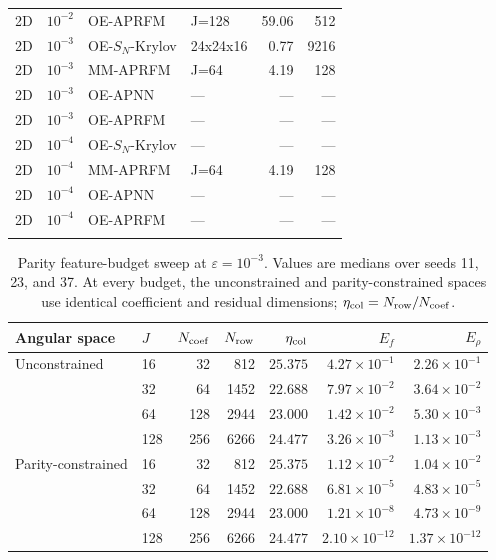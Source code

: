 \begin{table}[t]
\begin{tabular}{lcllrr}
2D & $10^{-2}$ & OE-APRFM & J=128 & 59.06 & 512\\
\addlinespace
2D & $10^{-3}$ & OE-$S_N$-Krylov & 24x24x16 & 0.77 & 9216\\
2D & $10^{-3}$ & MM-APRFM & J=64 & 4.19 & 128\\
2D & $10^{-3}$ & OE-APNN & --- & --- & ---\\
2D & $10^{-3}$ & OE-APRFM & --- & --- & ---\\
\addlinespace
2D & $10^{-4}$ & OE-$S_N$-Krylov & --- & --- & ---\\
2D & $10^{-4}$ & MM-APRFM & J=64 & 4.19 & 128\\
2D & $10^{-4}$ & OE-APNN & --- & --- & ---\\
2D & $10^{-4}$ & OE-APRFM & --- & --- & ---\\
\addlinespace
\bottomrule
\end{tabular}
\end{table}

\begin{table}[t]
\centering
\caption{Parity feature-budget sweep at $\varepsilon=10^{-3}$. Values are medians over seeds 11, 23, and 37. At every budget, the unconstrained and parity-constrained spaces use identical coefficient and residual dimensions; $\eta_{\rm col}=N_{\rm row}/N_{\rm coef}$.}
\label{tab:parity-budget}
\begin{tabular}{llrrrrr}
\toprule
Angular space & $J$ & $N_{\rm coef}$ & $N_{\rm row}$ & $\eta_{\rm col}$ & $E_f$ & $E_\rho$\\
\midrule
Unconstrained & 16 & 32 & 812 & $25.375$ & $4.27\times10^{-1}$ & $2.26\times10^{-1}$\\
 & 32 & 64 & 1452 & $22.688$ & $7.97\times10^{-2}$ & $3.64\times10^{-2}$\\
 & 64 & 128 & 2944 & $23.000$ & $1.42\times10^{-2}$ & $5.30\times10^{-3}$\\
 & 128 & 256 & 6266 & $24.477$ & $3.26\times10^{-3}$ & $1.13\times10^{-3}$\\
Parity-constrained & 16 & 32 & 812 & $25.375$ & $1.12\times10^{-2}$ & $1.04\times10^{-2}$\\
 & 32 & 64 & 1452 & $22.688$ & $6.81\times10^{-5}$ & $4.83\times10^{-5}$\\
 & 64 & 128 & 2944 & $23.000$ & $1.21\times10^{-8}$ & $4.73\times10^{-9}$\\
 & 128 & 256 & 6266 & $24.477$ & $2.10\times10^{-12}$ & $1.37\times10^{-12}$\\
\bottomrule
\end{tabular}
\end{table}

